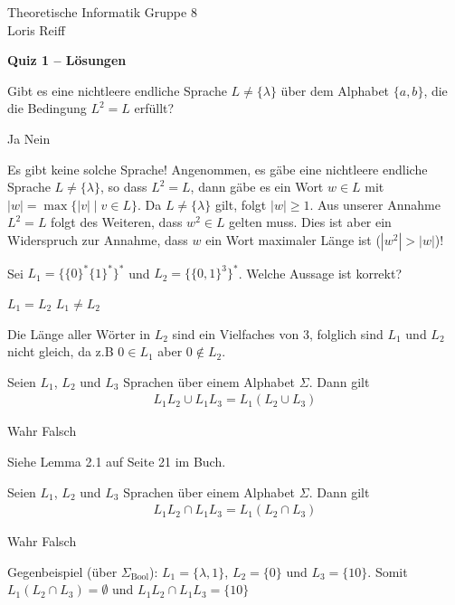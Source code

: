 \documentclass[a4paper,ngerman,12pt]{exam}
\begin{document}
\noindent Theoretische Informatik \hfill Gruppe 8 \\
\mbox{}\hfill Loris Reiff
\begin{center}
  \bfseries\Large
  Quiz 1 \ifprintanswers
  -- Lösungen
\fi
\end{center}

\begin{questions}
  \question Gibt es eine nichtleere endliche Sprache $L \neq \{\lambda\}$ über dem Alphabet
  $\{a,b\}$, die die Bedingung $L^2 = L$ erfüllt?

\begin{oneparcheckboxes}
\choice Ja
\CorrectChoice Nein
\end{oneparcheckboxes}
\begin{solution}
Es gibt keine solche Sprache!
Angenommen, es gäbe eine nichtleere endliche Sprache $L \neq \{\lambda\}$, so dass $L^2 = L$,
dann gäbe es ein Wort $w \in L$ mit $|w| = \max\{|v| \mid v \in L\}$. Da
$L \neq \{\lambda\}$ gilt, folgt $|w| \geq 1$. Aus unserer Annahme $L^2 = L$ folgt des
Weiteren, dass $w^2 \in L$ gelten muss.
Dies ist aber ein Widerspruch zur Annahme, dass $w$ ein Wort
maximaler Länge ist ($|w^2| > |w|$)!
\end{solution}

\question
  Sei $L_1 = \{\{0\}^*\{1\}^*\}^*$ und
      $L_2 = \{\{0, 1\}^3\}^*$. Welche Aussage ist korrekt?

\begin{oneparcheckboxes}
\choice $L_1 = L_2$
\CorrectChoice $L_1 \neq L_2$
\end{oneparcheckboxes}
  \begin{solution}
    Die Länge aller Wörter in $L_2$ sind ein Vielfaches von 3, folglich sind
    $L_1$ und $L_2$ nicht gleich, da z.B $0 \in L_1$ aber $0 \not\in L_2$.
  \end{solution}

\question
Seien $L_1$, $L_2$ und $L_3$ Sprachen über einem Alphabet $\Sigma$. Dann gilt
  \begin{align*}
    L_1L_2 \cup L_1L_3 = L_1(L_2 \cup L_3)
  \end{align*}
\begin{oneparcheckboxes}
\CorrectChoice Wahr
\choice Falsch
\end{oneparcheckboxes}
  \begin{solution}
    Siehe Lemma 2.1 auf Seite 21 im Buch.
  \end{solution}

\question
Seien $L_1$, $L_2$ und $L_3$ Sprachen über einem Alphabet $\Sigma$. Dann gilt
  \begin{align*}
    L_1L_2 \cap L_1L_3 = L_1(L_2 \cap L_3)
  \end{align*}
\begin{oneparcheckboxes}
\choice Wahr
\CorrectChoice Falsch
\end{oneparcheckboxes}
  \begin{solution}
    Gegenbeispiel (über $\Sigma_{\mathrm{Bool}}$): $L_1 = \{\lambda, 1\}$,
    $L_2 = \{0\}$ und $L_3 = \{10\}$. Somit
    $L_1(L_2 \cap L_3) = \emptyset$ und $L_1L_2 \cap L_1L_3 = \{10\}$
  \end{solution}



\end{questions}
\end{document}
